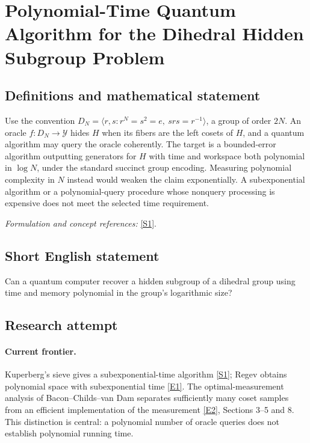 \documentclass[11pt,a4paper]{article}
\newcommand{\sref}[2]{\hyperlink{source:#1:#2}{[S#2]}}
\newcommand{\eref}[2]{\hyperlink{extra:#1:#2}{[E#2]}}
\newif\ifshowcatalogue
\newcommand{\cataloguescope}[1]{\ifshowcatalogue
 \paragraph{Exact scope in the supplied catalogue.}
 \begin{quote}\small #1\end{quote}\fi}
\begin{document}
\setcounter{section}{215}
\clearpage
\section{\texorpdfstring{Polynomial-Time Quantum Algorithm for the Dihedral Hidden Subgroup Problem}{Polynomial-Time Quantum Algorithm for the Dihedral Hidden Subgroup Problem}}\label{216}
\subsection{Definitions and mathematical statement}
Use the convention
$D_N=\langle r,s:r^N=s^2=e,\ srs=r^{-1}\rangle$, a group of order $2N$. An oracle $f:D_N\to\mathcal Y$ hides $H$ when its fibers are the left cosets of $H$, and a quantum algorithm may query the oracle coherently. The target is a bounded-error algorithm outputting generators for $H$ with time and workspace both polynomial in $\log N$, under the standard succinct group encoding. Measuring polynomial complexity in $N$ instead would weaken the claim exponentially. A subexponential algorithm or a polynomial-query procedure whose nonquery processing is expensive does not meet the selected time requirement.
\par\smallskip\textit{Formulation and concept references:} \sref{216}{1}.
\cataloguescope{Find a polynomial-time quantum algorithm with poly(log N) operations and space for the hidden subgroup problem in dihedral groups D\_N.}
\subsection{Short English statement}
Can a quantum computer recover a hidden subgroup of a dihedral group using time and memory polynomial in the group's logarithmic size?
\subsection{Research attempt}

\paragraph{Current frontier.}
Kuperberg's sieve gives a subexponential-time algorithm \sref{216}{1};
Regev obtains polynomial space with subexponential time \eref{216}{1}.
The optimal-measurement analysis of Bacon--Childs--van Dam separates
sufficiently many coset samples from an efficient implementation of the
measurement \eref{216}{2}, Sections 3--5 and 8. This distinction is central:
a polynomial number of oracle queries does not establish polynomial
running time.
\end{document}
